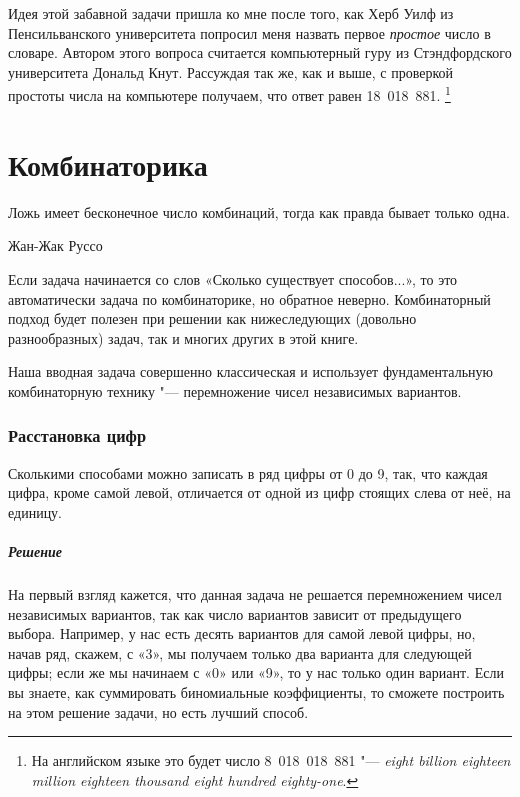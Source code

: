 \documentclass[twoside]{book}
\makeatletter
\newcommand{\rindex}[2][\imki@jobname]{%
  \index[#1]{\detokenize{#2}}%
}
\makeatother
\begin{document}
Идея этой забавной задачи пришла ко мне после того, как Херб Уилф из Пенсильванского университета %
попросил меня назвать первое \emph{простое} число в словаре.
Автором этого вопроса считается компьютерный гуру из Стэндфордского университета Дональд Кнут. %
Рассуждая так же, как и выше, с проверкой простоты числа на компьютере
получаем, что ответ равен 18~018~881.%
\footnote{На английском языке это будет число 8~018~018~881 "--- \emph{eight billion eighteen million eighteen thou\-sand eight hundred eighty-one}.
}


 









\chapter{Комбинаторика}

\setlength{\epigraphwidth}{.5\textwidth}
\epigraph{Ложь имеет бесконечное число комбинаций,
тогда как правда бывает только одна.\vspace{1ex}}{Жан-Жак Руссо}

 
 
Если задача начинается со слов «Сколько существует способов...», то это автоматически задача по комбинаторике, но обратное неверно.
Комбинаторный подход будет полезен при решении как нижеследующих (довольно разнообразных) задач, так и многих других в этой книге.

Наша вводная задача совершенно классическая и использует фундаментальную
комбинаторную технику "--- перемножение чисел независимых вариантов.

\subsection*{Расстановка цифр}%
\rindex{Расстановка цифр}

Сколькими способами можно записать в ряд цифры от 0 до 9, так, что каждая цифра, кроме самой левой, отличается от одной из цифр стоящих слева от неё, на единицу.

\paragraph{Решение} На первый взгляд кажется, что данная задача не
решается перемножением чисел независимых вариантов, так как число
вариантов зависит от предыдущего выбора.
Например, у нас есть десять вариантов для самой левой цифры, но, начав ряд, скажем, с «3», мы получаем только два варианта для следующей цифры;
если же мы начинаем с «0» или «9», то у нас только один вариант.
Если вы знаете, как суммировать биномиальные коэффициенты, то сможете построить на этом решение задачи, но есть лучший способ.
\end{document}

